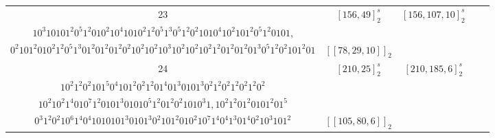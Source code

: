 \documentclass[journal]{IEEEtran}
\begin{document}
\begin{table}[!t]
\begin{tabular}{ccccc}
		23  & $[156, 49]_2^s$ & $[156, 107,10]_2^s$ &                                                                                \makecell[c]{$10101010^{7}10101010^{3}1$,\\$10^{3}10101^{2}0^{5}1^{2}010^{2}10^{4}1010^{2}1^{2}0^{5}1^{3}0^{5}1^{2}0^{2}1010^{4}10^{2}101^{2}0^{5}1^{2}0101$,\\ $0^{2}101^{2}010^{2}1^{2}0^{5}1^{3}01^{2}01^{2}01^{2}0^{2}10^{2}10^{2}10^{3}10^{2}10^{2}10^{2}1^{2}01^{2}01^{2}01^{3}0^{5}1^{2}0^{2}101^{2}01$}                                                                                & $[[78,29,10]]_2$ \\
		24  & $[210, 25]_2^s$ & $[210, 185,6]_2^s$  & \makecell[c]{$10^{2}1^{3}0^{2}1^{4}010^{5}1^{4}0^{2}1^{4}0^{3}10^{4}1^{4}01^{3}01^{2}01010^{5}1^{2}010^{4}101^{3}0^{5}1^{2}0^{2}1^2$,\\$10^{2}1^{2}0^{2}101^{5}0^{4}101^{2}0^{2}1^{2}01^{4}01^{3}0101^{3}0^{2}1^{2}0^{2}1^{2}0^{2}1^{2}0^{2}$\\$10^{2}10^{2}1^{4}010^{7}1^{2}0101^{3}01010^{5}1^{2}01^{2}0^{2}1010^{3}1,10^{2}1^{2}01^{2}0101^{2}01^{5}$\\$0^{3}1^{2}0^{2}10^{6}1^{4}0^{4}1010101^{3}0101^{3}0^{2}101^{2}010^{2}10^{7}1^{4}0^{4}1^{3}01^{4}0^{2}10^{3}101^2$} & $[[105,80,6]]_2$ \\ \hline
	\end{tabular}
\end{table}
\end{document}
